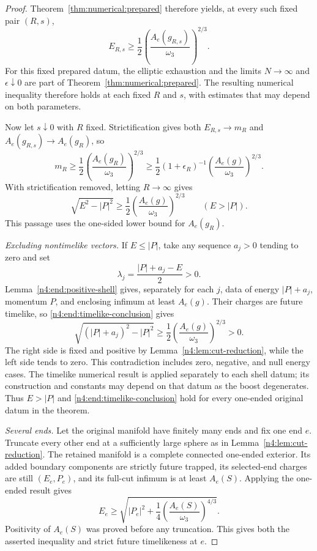 \begin{proof}
Theorem~\ref{thm:numerical:prepared} therefore yields, at every such
fixed pair $(R,s)$,
\begin{equation}\label{n4:end:fixed-prepared-inequality}
 E_{R,s}\ge\frac12
       \left(\frac{A_e(g_{R,s})}{\omega_3}\right)^{2/3}.
\end{equation}
For this fixed prepared datum, the elliptic exhaustion and the limits
$N\to\infty$ and $\epsilon\downarrow0$ are part of
Theorem~\ref{thm:numerical:prepared}. The resulting numerical inequality
therefore holds at each fixed $R$ and $s$, with estimates that may depend
on both parameters.

Now let $s\downarrow0$ with $R$ fixed. Strictification gives both
$E_{R,s}\to m_R$ and $A_e(g_{R,s})\to A_e(g_R)$, so
\[
 m_R\ge\frac12
       \left(\frac{A_e(g_R)}{\omega_3}\right)^{2/3}
 \ge\frac12(1+\epsilon_R)^{-1}
       \left(\frac{A_e(g)}{\omega_3}\right)^{2/3}.
\]
With strictification removed, letting $R\to\infty$ gives
\begin{equation}\label{n4:end:timelike-conclusion}
 \sqrt{E^2-|P|^2}\ge\frac12
       \left(\frac{A_e(g)}{\omega_3}\right)^{2/3}
       \qquad (E>|P|).
\end{equation}
This passage uses the one-sided lower bound for $A_e(g_R)$.

\smallskip
\noindent\emph{Excluding nontimelike vectors.} If $E\le|P|$,
take any sequence $a_j>0$ tending to zero and set
\[
 \lambda_j=\frac{|P|+a_j-E}{2}>0.
\]
Lemma~\ref{n4:end:positive-shell} gives, separately for each $j$,
data of energy $|P|+a_j$, momentum $P$, and enclosing infimum at
least $A_e(g)$. Their charges are future timelike, so
\eqref{n4:end:timelike-conclusion} gives
\[
 \sqrt{(|P|+a_j)^2-|P|^2}
 \ge\frac12\left(\frac{A_e(g)}{\omega_3}\right)^{2/3}>0.
\]
The right side is fixed and positive by
Lemma~\ref{n4:lem:cut-reduction}, while the left side tends to zero.
This contradiction includes zero, negative, and null energy cases.
The timelike numerical result is applied separately to each shell datum;
its construction and constants may depend on that datum as the boost
degenerates.
Thus $E>|P|$ and \eqref{n4:end:timelike-conclusion} hold for every
one-ended original datum in the theorem.

\smallskip
\noindent\emph{Several ends.} Let the original manifold have finitely many
ends and fix one end $e$. Truncate every other end at a sufficiently large sphere
as in Lemma~\ref{n4:lem:cut-reduction}. The retained manifold is a
complete connected one-ended exterior. Its added boundary components
are strictly future trapped, its selected-end charges are still
$(E_e,P_e)$, and its full-cut infimum is at least $A_e(S)$. Applying
the one-ended result gives
\[
 E_e\ge\sqrt{|P_e|^2+
              \frac14\left(\frac{A_e(S)}{\omega_3}\right)^{4/3}}.
\]
Positivity of $A_e(S)$ was proved before any truncation. This gives
both the asserted inequality and strict future timelikeness at $e$.
\end{proof}

